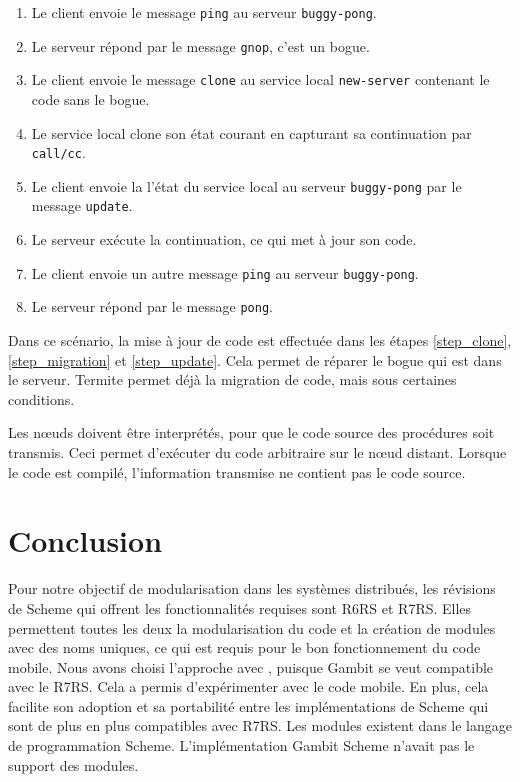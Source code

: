 \begin{enumerate}
  \item Le client envoie le message \texttt{ping} au serveur \texttt{buggy-pong}.
  \item Le serveur répond par le message \texttt{gnop}, c'est un bogue.
  \item Le client envoie le message \texttt{clone} au service local
    \texttt{new-server} contenant le code sans le bogue.

  \item\label{step_clone} Le service local clone son état courant en capturant sa
    continuation par \texttt{call/cc}.

  \item\label{step_migration} Le client envoie la l'état du service local au serveur \texttt{buggy-pong}
    par le message \texttt{update}.

  \item\label{step_update} Le serveur exécute la continuation, ce qui met à jour son code.

  \item Le client envoie un autre message \texttt{ping} au serveur \texttt{buggy-pong}.
  \item Le serveur répond par le message \texttt{pong}.
\end{enumerate}

Dans ce scénario, la mise à jour de code est effectuée dans les étapes
\ref{step_clone}, \ref{step_migration} et \ref{step_update}. Cela
permet de réparer le bogue qui est dans le serveur. Termite permet
déjà la migration de code, mais sous certaines conditions.

Les nœuds doivent être interprétés, pour que le code source des procédures soit
transmis. Ceci permet d'exécuter du code arbitraire sur le nœud distant.
Lorsque le code est compilé, l'information transmise ne contient pas le code
source.

\section{Conclusion}
%
Pour notre objectif de modularisation dans les systèmes distribués, les
révisions de Scheme qui offrent les fonctionnalités requises sont R6RS et R7RS.
Elles permettent toutes les deux la modularisation du code et la création de
modules avec des noms uniques, ce qui est requis pour le bon fonctionnement du
code mobile.   Nous avons choisi l'approche avec ,
puisque Gambit se veut compatible avec le R7RS. Cela a permis d'expérimenter
avec le code mobile. En plus, cela facilite son adoption et sa portabilité
entre les implémentations de Scheme qui sont de plus en plus compatibles avec
R7RS.
Les modules existent dans le langage de programmation Scheme. L'implémentation
Gambit Scheme n'avait pas le support des modules.

